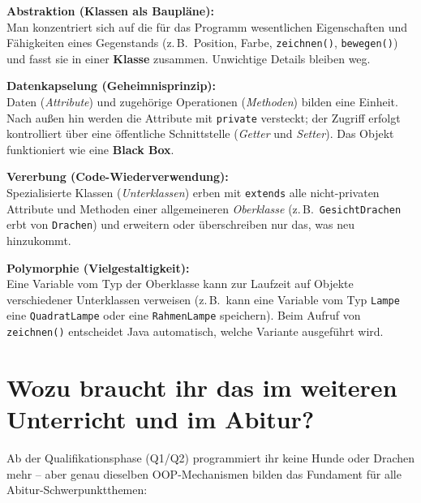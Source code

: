 \begin{compactenum}[1.]
  \item \textbf{Abstraktion (Klassen als Baupläne):}\\
  Man konzentriert sich auf die für das Programm wesentlichen Eigenschaften und
  Fähigkeiten eines Gegenstands (z.\,B.\ Position, Farbe, \lstinline|zeichnen()|,
  \lstinline|bewegen()|) und fasst sie in einer \textbf{Klasse} zusammen.
  Unwichtige Details bleiben weg.

  \item \textbf{Datenkapselung (Geheimnisprinzip):}\\
  Daten (\emph{Attribute}) und zugehörige Operationen (\emph{Methoden}) bilden
  eine Einheit. Nach außen hin werden die Attribute mit \lstinline|private|
  versteckt; der Zugriff erfolgt kontrolliert über eine öffentliche
  Schnittstelle (\emph{Getter} und \emph{Setter}). Das Objekt funktioniert wie
  eine \textbf{Black Box}.

  \item \textbf{Vererbung (Code-Wiederverwendung):}\\
  Spezialisierte Klassen (\emph{Unterklassen}) erben mit \lstinline|extends|
  alle nicht-privaten Attribute und Methoden einer allgemeineren
  \emph{Oberklasse} (z.\,B.\ \texttt{GesichtDrachen} erbt von \texttt{Drachen})
  und erweitern oder überschreiben nur das, was neu hinzukommt.

  \item \textbf{Polymorphie (\glqq Vielgestaltigkeit\grqq ):}\\
  Eine Variable vom Typ der Oberklasse kann zur Laufzeit auf Objekte
  verschiedener Unterklassen verweisen (z.\,B.\ kann eine Variable vom Typ
  \texttt{Lampe} eine \texttt{QuadratLampe} oder eine \texttt{RahmenLampe}
  speichern). Beim Aufruf von \lstinline|zeichnen()| entscheidet Java
  automatisch, welche Variante ausgeführt wird.
\end{compactenum}


\section{Wozu braucht ihr das im weiteren Unterricht und im Abitur?}

Ab der Qualifikationsphase (Q1/Q2) programmiert ihr keine Hunde oder Drachen
mehr -- aber genau dieselben OOP-Mechanismen bilden das Fundament für alle
Abitur-Schwerpunktthemen:

